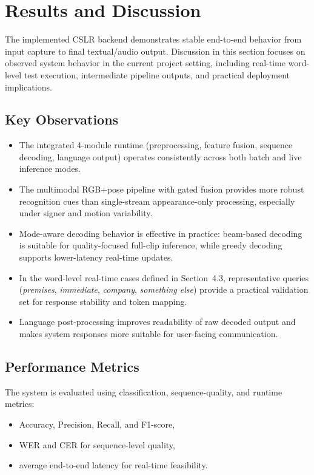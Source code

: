 \section{Results and Discussion}
The implemented CSLR backend demonstrates stable end-to-end behavior from input capture to final textual/audio output. Discussion in this section focuses on observed system behavior in the current project setting, including real-time word-level test execution, intermediate pipeline outputs, and practical deployment implications.

\subsection{Key Observations}
\begin{itemize}[leftmargin=1.5em]
\item The integrated 4-module runtime (preprocessing, feature fusion, sequence decoding, language output) operates consistently across both batch and live inference modes.
\item The multimodal RGB+pose pipeline with gated fusion provides more robust recognition cues than single-stream appearance-only processing, especially under signer and motion variability.
\item Mode-aware decoding behavior is effective in practice: beam-based decoding is suitable for quality-focused full-clip inference, while greedy decoding supports lower-latency real-time updates.
\item In the word-level real-time cases defined in Section~4.3, representative queries (\textit{premises}, \textit{immediate}, \textit{company}, \textit{something else}) provide a practical validation set for response stability and token mapping.
\item Language post-processing improves readability of raw decoded output and makes system responses more suitable for user-facing communication.
\end{itemize}

\subsection{Performance Metrics}
The system is evaluated using classification, sequence-quality, and runtime metrics:
\begin{itemize}[leftmargin=1.5em]
\item Accuracy, Precision, Recall, and F1-score,
\item WER and CER for sequence-level quality,
\item average end-to-end latency for real-time feasibility.
\end{itemize}


